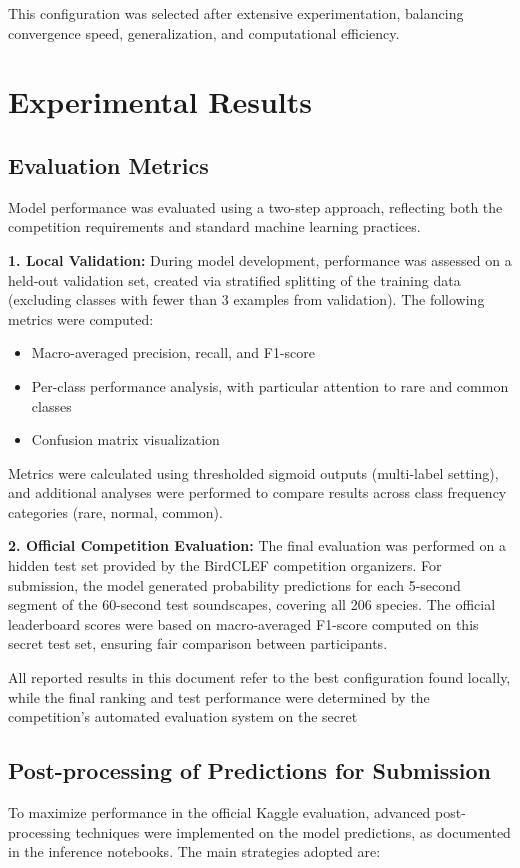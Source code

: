 \documentclass[ERTS, 2025]{ERTS}
\begin{document}
This configuration was selected after extensive experimentation, balancing convergence speed, generalization, and computational efficiency.

\section{Experimental Results}
\subsection{Evaluation Metrics}
Model performance was evaluated using a two-step approach, reflecting both the competition requirements and standard machine learning practices.

\textbf{1. Local Validation:}
During model development, performance was assessed on a held-out validation set, created via stratified splitting of the training data (excluding classes with fewer than 3 examples from validation). The following metrics were computed:
\begin{itemize}
    \item Macro-averaged precision, recall, and F1-score
    \item Per-class performance analysis, with particular attention to rare and common classes
    \item Confusion matrix visualization
\end{itemize}
Metrics were calculated using thresholded sigmoid outputs (multi-label setting), and additional analyses were performed to compare results across class frequency categories (rare, normal, common).

\textbf{2. Official Competition Evaluation:}
The final evaluation was performed on a hidden test set provided by the BirdCLEF competition organizers. For submission, the model generated probability predictions for each 5-second segment of the 60-second test soundscapes, covering all 206 species. The official leaderboard scores were based on macro-averaged F1-score computed on this secret test set, ensuring fair comparison between participants.

All reported results in this document refer to the best configuration found locally, while the final ranking and test performance were determined by the competition's automated evaluation system on the secret

\subsection{Post-processing of Predictions for Submission}
To maximize performance in the official Kaggle evaluation, advanced post-processing techniques were implemented on the model predictions, as documented in the inference notebooks. The main strategies adopted are:
\end{document}
